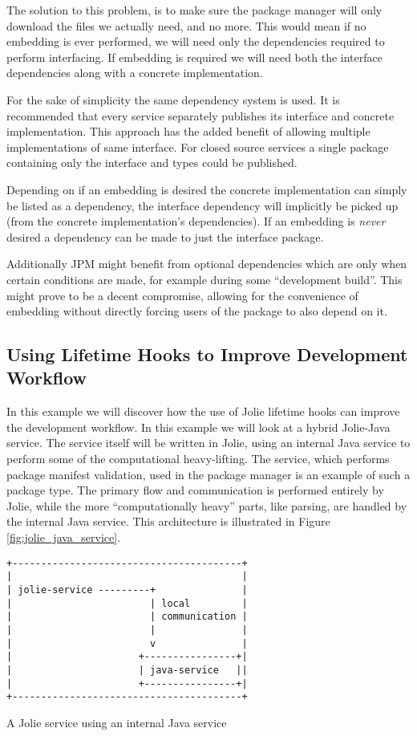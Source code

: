 The solution to this problem, is to make sure the package manager will only
download the files we actually need, and no more. This would mean if no
embedding is ever performed, we will need only the dependencies required to
perform interfacing. If embedding is required we will need both the interface
dependencies along with a concrete implementation.

For the sake of simplicity the same dependency system is used. It is
recommended that every service separately publishes its interface and concrete
implementation. This approach has the added benefit of allowing multiple
implementations of same interface. For closed source services a single package
containing only the interface and types could be published.

Depending on if an embedding is desired the concrete implementation can simply
be listed as a dependency, the interface dependency will implicitly be picked
up (from the concrete implementation's dependencies). If an embedding is
\emph{never} desired a dependency can be made to just the interface package.

Additionally JPM might benefit from optional dependencies which are only when
certain conditions are made, for example during some ``development build''.
This might prove to be a decent compromise, allowing for the convenience of
embedding without directly forcing users of the package to also depend on it.

\subsection{Using Lifetime Hooks to Improve Development Workflow}

In this example we will discover how the use of Jolie lifetime hooks can
improve the development workflow. In this example we will look at a hybrid
Jolie-Java service. The service itself will be written in Jolie, using an
internal Java service to perform some of the computational heavy-lifting.  The
 service, which performs package manifest validation, used in
the package manager is an example of such a package type. The primary flow and
communication is performed entirely by Jolie, while the more ``computationally
heavy'' parts, like parsing, are handled by the internal Java service.  This
architecture is illustrated in Figure \ref{fig:jolie_java_service}.

\begin{listing}[H]
\begin{verbatim}
+----------------------------------------+
|                                        |
| jolie-service ---------+               |
|                        | local         |
|                        | communication |
|                        |               |
|                        v               |
|                      +----------------+|
|                      | java-service   ||
|                      +----------------+|
+----------------------------------------+
\end{verbatim}
\caption{A Jolie service using an internal Java service}
\label{fig:jolie_java_service}
\end{listing}

